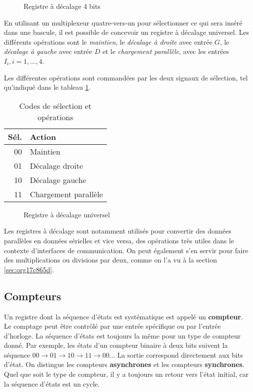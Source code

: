 \documentclass[11pt]{article}
\begin{document}
\begin{figure}[htbp]
\centering

\caption{\label{fig:org8bfed8e}Registre à décalage 4 bits}
\end{figure}

En utilisant un multiplexeur quatre-vers-un pour sélectionner ce qui
sera inséré dans une bascule, il est possible de concevoir un registre
à décalage universel. Les différents opérations sont le \emph{maintien}, le
\emph{décalage à droite} avec entrée \(G\), le \emph{décalage à gauche} avec entrée
\(D\) et le \emph{chargement parallèle}, avec les entrées \(I_i, i=1, \ldots,
4\).

Les différentes opérations sont commandées par les deux signaux de
sélection, tel qu'indiqué dans le tableau \ref{tab:org73d206f}.

\begin{table}[htbp]
\caption{\label{tab:org73d206f}Codes de sélection et opérations}
\centering
\begin{tabular}{rl}
Sél. & Action\\
\hline
00 & Maintien\\
01 & Décalage droite\\
10 & Décalage gauche\\
11 & Chargement parallèle\\
\end{tabular}
\end{table}

\begin{figure}[htbp]
\centering

\caption{\label{fig:org74c4857}Registre à décalage universel}
\end{figure} 

Les registres à décalage sont notamment utilisés pour convertir des
données parallèles en données sérielles et vice versa, des opérations
très utiles dans le contexte d'interfaces de communication. On peut
également s'en servir pour faire des multiplications ou divisions par
deux, comme on l'a vu à la section \ref{sec:org17c865d}.



\subsection{Compteurs}
\label{sec:orgad9610f}

Un registre dont la séquence d'états est systématique est appelé un
\textbf{compteur}. Le comptage peut être contrôlé par une entrée spécifique
ou par l'entrée d'horloge. La séquence d'états est toujours la même
pour un type de compteur donné. Par exemple, les états d'un compteur
binaire à deux bits suivent la séquence \(00 \rightarrow 01
\rightarrow 10 \rightarrow 11 \rightarrow 00 \ldots\) La sortie
correspond directement aux bits d'état. On distingue les compteurs
\textbf{asynchrones} et les compteurs \textbf{synchrones}. Quel que soit le type de
compteur, il y a toujours un retour vers l'état initial, car la
séquence d'états est un cycle.
\end{document}

